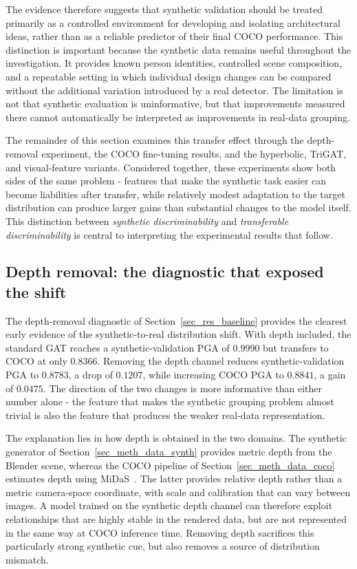 The evidence therefore suggests that synthetic validation should be
treated primarily as a controlled environment for developing and
isolating architectural ideas,
rather than as a reliable predictor of their final COCO performance.
This distinction is important because the synthetic data remains useful
throughout the investigation.
It provides known person identities,
controlled scene composition,
and a repeatable setting in which individual design changes can be
compared without the additional variation introduced by a real detector.
The limitation is not that synthetic evaluation is uninformative,
but that improvements measured there cannot automatically be interpreted
as improvements in real-data grouping.

The remainder of this section examines this transfer effect through the
depth-removal experiment,
the COCO fine-tuning results,
and the hyperbolic,
TriGAT,
and visual-feature variants.
Considered together, these experiments show both sides of the same
problem -
features that make the synthetic task easier can become liabilities
after transfer,
while relatively modest adaptation to the target distribution can
produce larger gains than substantial changes to the model itself.
This distinction between \emph{synthetic discriminability} and
\emph{transferable discriminability} is central to interpreting the
experimental results that follow.

\subsection{Depth removal: the diagnostic that exposed the shift}
\label{sec_disc_transfer_depth}

The depth-removal diagnostic of Section~\ref{sec_res_baseline} provides
the clearest early evidence of the synthetic-to-real distribution shift.
With depth included, the standard GAT reaches a synthetic-validation
PGA of $0.9990$ but transfers to COCO at only $0.8366$.
Removing the depth channel reduces synthetic-validation PGA to $0.8783$,
a drop of $0.1207$,
while increasing COCO PGA to $0.8841$,
a gain of $0.0475$.
The direction of the two changes is more informative than either number
alone -
the feature that makes the synthetic grouping problem almost trivial is
also the feature that produces the weaker real-data representation.

The explanation lies in how depth is obtained in the two domains.
The synthetic generator of Section~\ref{sec_meth_data_synth} provides
metric depth from the Blender scene,
whereas the COCO pipeline of Section~\ref{sec_meth_data_coco} estimates
depth using MiDaS~\cite{ranftl2020midas}.
The latter provides relative depth rather than a metric camera-space
coordinate,
with scale and calibration that can vary between images.
A model trained on the synthetic depth channel can therefore exploit
relationships that are highly stable in the rendered data,
but are not represented in the same way at COCO inference time.
Removing depth sacrifices this particularly strong synthetic cue,
but also removes a source of distribution mismatch.


